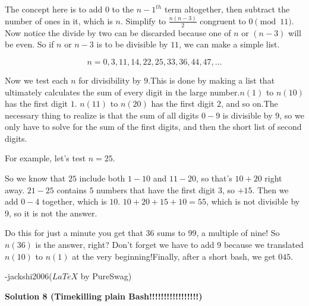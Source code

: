 \begin{enumerate}
 The concept here is to add $0$ to the $n-1^{th}$ term altogether, then subtract the number of ones in it, which is $n$. Simplify to $\frac{n(n-3)}{2}$ congruent to $0 \pmod{11}$. Now notice the divide by two can be discarded because one of $n$ or $(n-3)$ will be even. So if $n$ or $n-3$ is to be divisible by $11$, we can make a simple list. 

 
 \[n = 0, 3, 11, 14, 22, 25, 33, 36, 44, 47, \dots\]

 Now we test each $n$ for divisibility by $9$.This is done by making a list that ultimately calculates the sum of every digit in the large number.$n(1)$ to $n(10)$ has the first digit $1$. $n(11)$ to $n(20)$ has the first digit $2$, and so on.The necessary thing to realize is that the sum of all digits $0-9$ is divisible by $9$, so we only have to solve for the sum of the first digits, and then the short list of second digits.

 For example, let's test $n=25$.

 So we know that $25$ include both $1-10$ and $11-20$, so that's $10 + 20$ right away. $21-25$ contains $5$ numbers that have the first digit $3$, so $+15$. Then we add $0-4$ together, which is $10$. $10+20+15+10=55$, which is not divisible by $9$, so it is not the answer. 

 Do this for just a minute you get that $36$ sums to $99$, a multiple of nine! So $n(36)$ is the answer, right? Don't forget we have to add $9$ because we translated $n(10)$ to $n(1)$ at the very beginning!Finally, after a short bash, we get $\boxed{045}$.

 -jackshi2006($LaTeX$ by PureSwag)

 



\textbf{Solution 8 (Timekilling plain Bash!!!!!!!!!!!!!!!!!)}


\end{enumerate}
